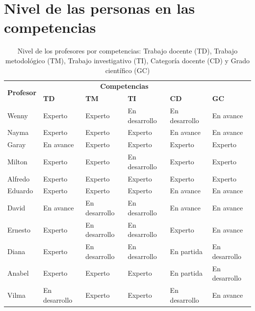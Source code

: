 {\chapter{Nivel de las personas en las competencias}

\begin{table}[H]
	\centering
	\hspace{2cm}
	\caption{Nivel de los profesores por competencias: Trabajo docente (TD), Trabajo metodológico (TM), Trabajo investigativo (TI), Categoría docente (CD) y Grado científico (GC)}\label{table:nivel-pers-comp2}
	\begin{tabular}{l l l l l l}
		\toprule
		\multirow{2}{2cm}{\textbf{Profesor}} &           \multicolumn{4}{c}{\textbf{Competencias}}           &  \\ \cline{2-6}
		                                       & \textbf{TD}   & \textbf{TM}   & \textbf{TI}   & \textbf{CD}   & \textbf{GC}   \\ \midrule
		Wenny                                  & Experto       & Experto       & En desarrollo & En desarrollo & En avance     \\ \hline
		Nayma                                  & Experto       & Experto       & Experto       & En avance     & En avance     \\ \hline
		Garay                                  & En avance     & Experto       & Experto       & Experto       & Experto       \\ \hline
		Milton                                 & Experto       & Experto       & En desarrollo & Experto       & Experto       \\ \hline
		Alfredo                                & Experto       & Experto       & Experto       & Experto       & Experto       \\ \hline
		Eduardo                                & Experto       & Experto       & Experto       & En avance     & En avance     \\ \hline
		David                                  & En avance     & En desarrollo & En desarrollo & En avance     & En avance     \\ \hline
		Ernesto                                & Experto       & En desarrollo & En desarrollo & Experto       & En avance     \\ \hline
		Diana                                  & Experto       & En desarrollo & En desarrollo & En partida    & En desarrollo \\ \hline
		Anabel                                 & Experto       & Experto       & Experto       & En partida    & En desarrollo \\ \hline
		Vilma                                  & En desarrollo & Experto       & Experto       & En desarrollo & En avance     \\ \bottomrule
	\end{tabular}
\end{table}

}
